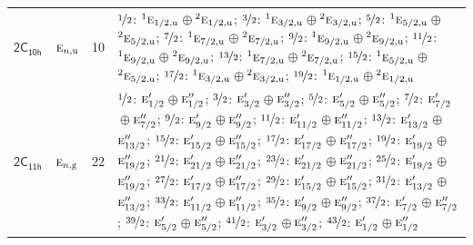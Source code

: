 \documentclass[10pt,a4paper]{article}
\numberwithin{equation}{section}
\newcommand{\grp}[1]{\mathsf{#1}}
\newcommand{\irr}[1]{\text{\normalfont\scshape #1}}
\newcommand{\conjpair}[1]{{}^{#1}}
\newcommand{\ptag}[1]{\mathrm{#1}}
\newlength{\fillwidth}\newlength{\cellwidth}\newlength{\colwidth}
\begin{document}
{\begin{longtable}{@{}llr>{\RaggedRight\arraybackslash}p{\fillwidth}@{}}
\href{2C10h.pdf}{$\grp{2C_{10h}}$} & $\irr{e}_{n,\ptag{u}}$ & 10 & $\nicefrac{1}{2}$: $\conjpair{1}\irr{e}_{1/2,\ptag{u}}$${}\oplus{}$$\conjpair{2}\irr{e}_{1/2,\ptag{u}}$; $\nicefrac{3}{2}$: $\conjpair{1}\irr{e}_{3/2,\ptag{u}}$${}\oplus{}$$\conjpair{2}\irr{e}_{3/2,\ptag{u}}$; $\nicefrac{5}{2}$: $\conjpair{1}\irr{e}_{5/2,\ptag{u}}$${}\oplus{}$$\conjpair{2}\irr{e}_{5/2,\ptag{u}}$; $\nicefrac{7}{2}$: $\conjpair{1}\irr{e}_{7/2,\ptag{u}}$${}\oplus{}$$\conjpair{2}\irr{e}_{7/2,\ptag{u}}$; $\nicefrac{9}{2}$: $\conjpair{1}\irr{e}_{9/2,\ptag{u}}$${}\oplus{}$$\conjpair{2}\irr{e}_{9/2,\ptag{u}}$; $\nicefrac{11}{2}$: $\conjpair{1}\irr{e}_{9/2,\ptag{u}}$${}\oplus{}$$\conjpair{2}\irr{e}_{9/2,\ptag{u}}$; $\nicefrac{13}{2}$: $\conjpair{1}\irr{e}_{7/2,\ptag{u}}$${}\oplus{}$$\conjpair{2}\irr{e}_{7/2,\ptag{u}}$; $\nicefrac{15}{2}$: $\conjpair{1}\irr{e}_{5/2,\ptag{u}}$${}\oplus{}$$\conjpair{2}\irr{e}_{5/2,\ptag{u}}$; $\nicefrac{17}{2}$: $\conjpair{1}\irr{e}_{3/2,\ptag{u}}$${}\oplus{}$$\conjpair{2}\irr{e}_{3/2,\ptag{u}}$; $\nicefrac{19}{2}$: $\conjpair{1}\irr{e}_{1/2,\ptag{u}}$${}\oplus{}$$\conjpair{2}\irr{e}_{1/2,\ptag{u}}$\\
\href{2C11h.pdf}{$\grp{2C_{11h}}$} & $\irr{e}_{n,\ptag{g}}$ & 22 & $\nicefrac{1}{2}$: $\irr{e}_{1/2}'$${}\oplus{}$$\irr{e}_{1/2}''$; $\nicefrac{3}{2}$: $\irr{e}_{3/2}'$${}\oplus{}$$\irr{e}_{3/2}''$; $\nicefrac{5}{2}$: $\irr{e}_{5/2}'$${}\oplus{}$$\irr{e}_{5/2}''$; $\nicefrac{7}{2}$: $\irr{e}_{7/2}'$${}\oplus{}$$\irr{e}_{7/2}''$; $\nicefrac{9}{2}$: $\irr{e}_{9/2}'$${}\oplus{}$$\irr{e}_{9/2}''$; $\nicefrac{11}{2}$: $\irr{e}_{11/2}'$${}\oplus{}$$\irr{e}_{11/2}''$; $\nicefrac{13}{2}$: $\irr{e}_{13/2}'$${}\oplus{}$$\irr{e}_{13/2}''$; $\nicefrac{15}{2}$: $\irr{e}_{15/2}'$${}\oplus{}$$\irr{e}_{15/2}''$; $\nicefrac{17}{2}$: $\irr{e}_{17/2}'$${}\oplus{}$$\irr{e}_{17/2}''$; $\nicefrac{19}{2}$: $\irr{e}_{19/2}'$${}\oplus{}$$\irr{e}_{19/2}''$; $\nicefrac{21}{2}$: $\irr{e}_{21/2}'$${}\oplus{}$$\irr{e}_{21/2}''$; $\nicefrac{23}{2}$: $\irr{e}_{21/2}'$${}\oplus{}$$\irr{e}_{21/2}''$; $\nicefrac{25}{2}$: $\irr{e}_{19/2}'$${}\oplus{}$$\irr{e}_{19/2}''$; $\nicefrac{27}{2}$: $\irr{e}_{17/2}'$${}\oplus{}$$\irr{e}_{17/2}''$; $\nicefrac{29}{2}$: $\irr{e}_{15/2}'$${}\oplus{}$$\irr{e}_{15/2}''$; $\nicefrac{31}{2}$: $\irr{e}_{13/2}'$${}\oplus{}$$\irr{e}_{13/2}''$; $\nicefrac{33}{2}$: $\irr{e}_{11/2}'$${}\oplus{}$$\irr{e}_{11/2}''$; $\nicefrac{35}{2}$: $\irr{e}_{9/2}'$${}\oplus{}$$\irr{e}_{9/2}''$; $\nicefrac{37}{2}$: $\irr{e}_{7/2}'$${}\oplus{}$$\irr{e}_{7/2}''$; $\nicefrac{39}{2}$: $\irr{e}_{5/2}'$${}\oplus{}$$\irr{e}_{5/2}''$; $\nicefrac{41}{2}$: $\irr{e}_{3/2}'$${}\oplus{}$$\irr{e}_{3/2}''$; $\nicefrac{43}{2}$: $\irr{e}_{1/2}'$${}\oplus{}$$\irr{e}_{1/2}''$\\

\end{longtable}}
\end{document}
